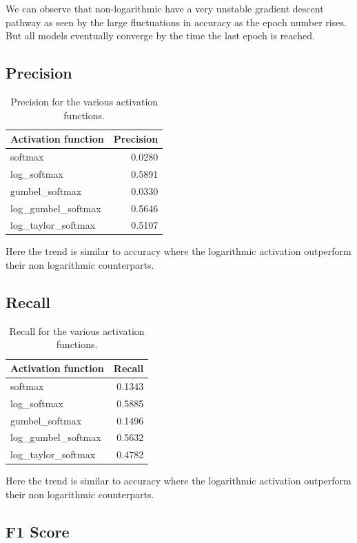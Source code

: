 \documentclass{article}
\begin{document}
\noindent
\newline
We can observe that non-logarithmic have a very unstable gradient descent pathway as seen by the large fluctuations in accuracy as the epoch number rises. But all models eventually converge by the time the last epoch is reached.

\newpage
\subsection{Precision}

\begin{table}[h]
\centering
\begin{tabular}{l|r}
Activation function & Precision \\\hline
softmax & 0.0280\\
log\_softmax & 0.5891 \\
gumbel\_softmax & 0.0330 \\
log\_gumbel\_softmax & 0.5646\\
log\_taylor\_softmax & 0.5107 
\end{tabular}
\caption{\label{tab:widgets}Precision for the various activation functions.}
\end{table}
\noindent
Here the trend is similar to accuracy where the logarithmic activation outperform their non logarithmic counterparts.

\subsection{Recall}

\begin{table}[h]
\centering

\begin{tabular}{l|r}
Activation function & Recall \\\hline
softmax & 0.1343 \\
log\_softmax & 0.5885 \\
gumbel\_softmax & 0.1496 \\
log\_gumbel\_softmax & 0.5632 \\
log\_taylor\_softmax & 0.4782 
\end{tabular}
\caption{\label{tab:widgets}Recall for the various activation functions.}
\end{table}
\noindent

Here the trend is similar to accuracy where the logarithmic activation outperform their non logarithmic counterparts.


\subsection{F1 Score}
\end{document}
